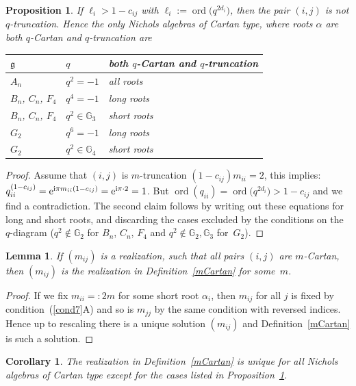 \documentclass[10pt,a4paper]{amsart}
\numberwithin{equation}{section}
\newtheorem{cor}[teo]{Corollary}
\newtheorem{lem}[teo]{Lemma}
\newtheorem{prop}[teo]{Proposition}
\begin{document}
\begin{prop}\label{prop_CartanTrunc} If $\ell_i > 1- c_{ij}$ with $\ell_i := \operatorname{ord}\big(q^{2d_i}\big)$, then the pair $(i,j)$ is not $q$-truncation. Hence the only Nichols algebras of Cartan type, where roots $\alpha$ are both $q$-Cartan and $q$-truncation are
\begin{center}\renewcommand{\arraystretch}{1.2}
	\begin{tabular}{lll}
	$\mathfrak{g}$ & $q$ & both $q$-Cartan and $q$-truncation\\
	 \hline
	 $A_n$ & $q^2=-1$ & all roots \\
	 $B_n$, $C_n$, $F_4$ & $q^4=-1$ & long roots \\
	 $B_n$, $C_n$, $F_4$ & $q^2\in\mathbb{G}_3$ & short roots \\
	 $G_2$ & $q^6=-1$ & long roots \\
	 $G_2$ & $q^2\in \mathbb{G}_4$ & short roots \\
	\end{tabular}
\end{center}
\end{prop}
\begin{proof} Assume that $(i,j)$ is $m$-truncation $(1-c_{ij})m_{ii} = 2$, this implies: $q_{ii}^{(1-c_{ij})}={\rm e}^{{\rm i}\pi m_{ii}(1-c_{ij})}={\rm e}^{{\rm i}\pi \cdot 2}=1$. But $\operatorname{ord}(q_{ii})= \operatorname{ord}\big(q^{2d_i}\big) > 1- c_{ij}$ and we find a contradiction. The second claim follows by writing out these equations for long and short roots, and discarding the cases excluded by the conditions on the $q$-diagram ($q^2\not\in\mathbb{G}_2$ for $B_n$, $C_n$, $F_4$ and $q^2\not\in \mathbb{G}_2,\mathbb{G}_3$ for~$G_2$).
\end{proof}

\begin{lem}\label{cartanclassification}
If $(m_{ij})$ is a realization, such that all pairs $(i,j)$ are $m$-Cartan, then $(m_{ij})$ is the realization in Definition~{\rm \ref{mCartan}} for some~$m$.
\end{lem}
\begin{proof} If we fix $m_{ii}=:2m$ for some short root $\alpha_i$, then $m_{ij}$ for all $j$ is fixed by condition~(\ref{cond7}A) and so is $m_{jj}$ by the same condition with reversed indices. Hence up to rescaling there is a unique solution $(m_{ij})$ and Definition~\ref{mCartan} is such a solution.
\end{proof}
\begin{cor}The realization in Definition~{\rm \ref{mCartan}} is unique for all Nichols algebras of Cartan type except for the cases listed in Proposition~{\rm \ref{prop_CartanTrunc}}.
\end{cor}
\end{document}
